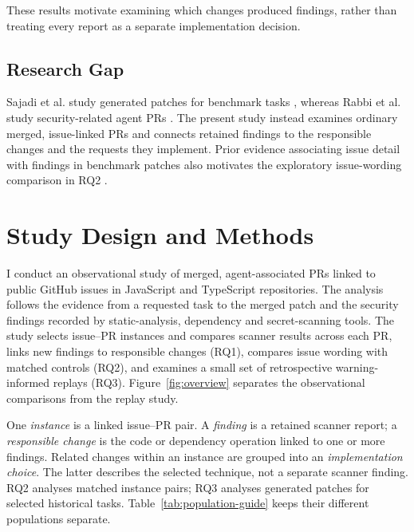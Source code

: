 \documentclass[acmsmall,screen,nonacm]{acmart}
\begin{document}
These results motivate examining which changes produced findings, rather than treating every report as a separate implementation decision.

\subsection{Research Gap}

Sajadi et al. study generated patches for benchmark tasks \cite{b36}, whereas Rabbi et al. study security-related agent PRs \cite{b37}. The present study instead examines ordinary merged, issue-linked PRs and connects retained findings to the responsible changes and the requests they implement. Prior evidence associating issue detail with findings in benchmark patches also motivates the exploratory issue-wording comparison in RQ2 \cite{b36}.

\section{Study Design and Methods}

I conduct an observational study of merged, agent-associated PRs linked to public GitHub issues in JavaScript and TypeScript repositories. The analysis follows the evidence from a requested task to the merged patch and the security findings recorded by static-analysis, dependency and secret-scanning tools. The study selects issue--PR instances and compares scanner results across each PR, links new findings to responsible changes (RQ1), compares issue wording with matched controls (RQ2), and examines a small set of retrospective warning-informed replays (RQ3). Figure~\ref{fig:overview} separates the observational comparisons from the replay study.

One \emph{instance} is a linked issue--PR pair. A \emph{finding} is a retained scanner report; a \emph{responsible change} is the code or dependency operation linked to one or more findings. Related changes within an instance are grouped into an \emph{implementation choice}. The latter describes the selected technique, not a separate scanner finding. RQ2 analyses matched instance pairs; RQ3 analyses generated patches for selected historical tasks. Table~\ref{tab:population-guide} keeps their different populations separate.
\end{document}
